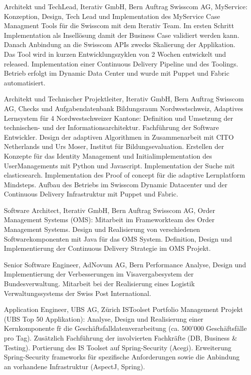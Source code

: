 \documentclass[10pt]{moderncv}
\begin{document}
\workitem{}
{Architekt und TechLead, Iterativ GmbH, Bern}
{Auftrag Swisscom AG, MyService:\smallpara 
Konzeption, Design, Tech Lead und Implementation des MyService Case Managment Tools f\"ur die Swisscom mit dem Iterativ Team. Im ersten Schritt Implementation als Insell\"osung damit der Business Case validiert werden kann. Danach Anbindung an die Swisscom APIs zwecks Skalierung der Applikation. Das Tool wird in kurzen Entwicklungszyklen von 2 Wochen entwickelt und released. Implementation einer Continuous Delivery Pipeline und des Toolings. Betrieb erfolgt im Dynamic Data Center und wurde mit Puppet und Fabric automatisiert.}

\workitem{}
{Architekt und Technischer Projektleiter, Iterativ GmbH, Bern}
{Auftrag Swisscom AG, Checks und Aufgabendatenbank Bildungsraum Nordwestschweiz, Adaptives Lernsystem f\"ur 4 Nordwestschweizer Kantone:\smallpara
Definition und Umsetzung der technischen- und der Informationsarchitektur. Fachf\"uhrung der Software Entwickler.
Design der adaptiven Algorithmen in Zusammenarbeit mit CITO Netherlands und Urs Moser, Institut f\"ur Bildungsevaluation.\smallpara 
Erstellen der Konzepte f\"ur das Identity Management und Initialimplementation des UserManagements mit Python und Javascript. 
Implementation der Suche mit elasticsearch. Implementation des Proof of concept f\"ur die adaptive Lernplatform Mindsteps.\smallpara
Aufbau des Betriebs im Swisscom Dynamic Datacenter und der Continuous Delivery Infrastruktur mit Puppet und Fabric.}

\workitem{}
{Software Architect, Iterativ GmbH, Bern}
{Auftrag Swisscom AG, Order Management Systems (OMS):\smallpara
Mitarbeit im Frameworkteam des Order Management Systems. 
Design und Realisierung von verschiedenen Softwarekomponenten mit Java f\"ur das OMS System.\smallpara
Definition, Design und Implementierung der Continuous Delivery Strategie im OMS Projekt.}

{Senior Software Engineer, AdNovum AG, Bern}
{Performance Analyse, Design und Implementierung der Verbesserungen im Visavergabesystem der Bundesverwaltung. \smallpara
Mitarbeit bei der Realisierung eines Logistik Verwaltungssystems der Swiss Post International.}

{Application Engineer, UBS AG, Z\"urich}
{ISToolset Portfolio Management Projekt (UBS Top 50 Applikation): \smallpara
Analyse, Design und Realisierung einer Kernkomponente f\"r die Gesch\"aftsfalldatenverarbeitung (ca. 500'000 Gesch\"aftsf\"alle pro Tag). Zus\"atzlich Fachf\"uhrung der involvierten 
Fachkr\"afte (DB, Business \& Testing). \smallpara
Portierung des IS Toolset auf Spring-Security (Acegi). Erweiterung Spring-Security frameworks f\"ur spezifische Anforderungen sowie die Anbindung an vorhandene Infrastruktur (AspectJ, Spring).}
\end{document}
